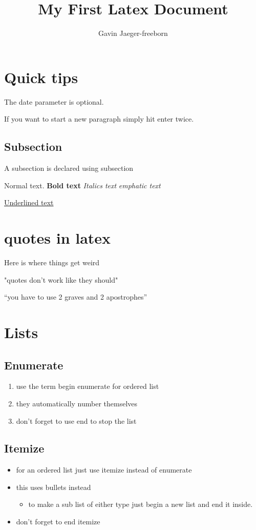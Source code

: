 \documentclass{article}
\begin{document}
\author {Gavin Jaeger-freeborn}

\title{My First Latex Document}

\date{}
\maketitle
\section{Quick tips} 
The date parameter is optional.

If you want to start a new paragraph simply hit enter twice.

\subsection{Subsection}
A subsection is declared using subsection

Normal text. \textbf{Bold text} \textit{Italics text} \emph{emphatic text}

\underline{Underlined text}


\section{quotes in latex}

Here is where things get weird



"quotes don't work like they should"

``you have to use 2 graves and 2 apostrophes''

\section{Lists}
\subsection{Enumerate}
\begin{enumerate}
\item use the term begin enumerate for ordered list
\item they automatically number themselves
\item don't forget to use end to stop the list
\end{enumerate}
\subsection{Itemize}
\begin{itemize}
\item for an ordered list just use itemize instead of enumerate
\item this uses bullets instead
	\begin{itemize}
	\item to make a sub list of either type just begin a new list and end it
		inside.
	\end{itemize}
\item don't forget to end itemize
\end{itemize}
\end{document}
